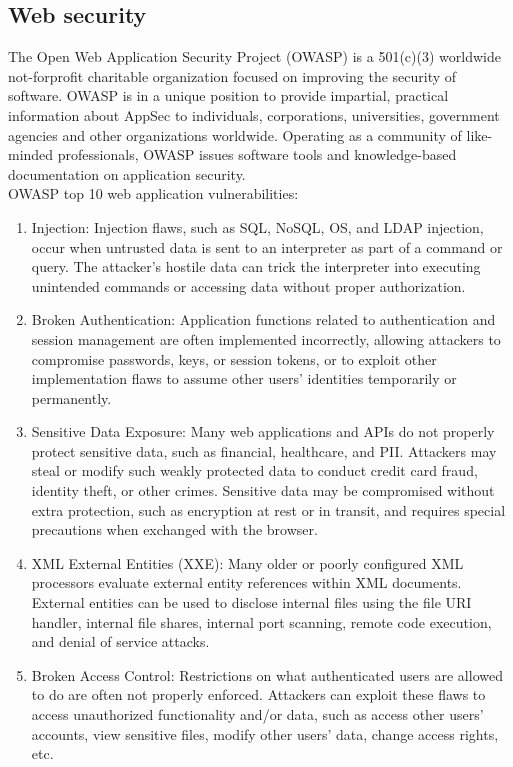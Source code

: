 \documentclass[12pt]{article}
\begin{document}
 \subsection{Web security}
 The Open Web Application Security Project (OWASP) is a 501(c)(3) worldwide not-forprofit charitable organization focused on improving the security of software. OWASP is in a unique position to provide impartial, practical
 information about AppSec to individuals, corporations, universities, government agencies and other organizations worldwide. Operating as a community of like-minded professionals, OWASP issues software tools and knowledge-based documentation on application security.\\
 OWASP top 10 web application vulnerabilities:
 \begin{enumerate}
 	\item Injection: Injection flaws, such as SQL, NoSQL, OS, and LDAP injection, occur when untrusted data is
 	sent to an interpreter as part of a command or query. The attacker's hostile data can trick	the interpreter into executing unintended commands or accessing data without proper	authorization.
 	\item Broken Authentication: Application functions related to authentication and session management are often
 	implemented incorrectly, allowing attackers to compromise passwords, keys, or session tokens, or to exploit other implementation flaws to assume other users' identities temporarily or permanently.
 	\item Sensitive Data Exposure: Many web applications and APIs do not properly protect sensitive data, such as financial, healthcare, and PII. Attackers may steal or modify such weakly protected data to conduct credit card fraud, identity theft, or other crimes. Sensitive data may be compromised without extra protection, such as encryption at rest or in transit, and requires special precautions when exchanged with the browser.
 	\item XML External Entities (XXE): Many older or poorly configured XML processors evaluate external entity references within XML documents. External entities can be used to disclose internal files using the file URI handler, internal file shares, internal port scanning, remote code execution, and denial of service attacks.
 	\item Broken Access Control: Restrictions on what authenticated users are allowed to do are often not properly
 	enforced. Attackers can exploit these flaws to access unauthorized functionality and/or data, such as access other users' accounts, view sensitive files, modify other users' data, change access rights, etc.

\end{enumerate}
\end{document}
